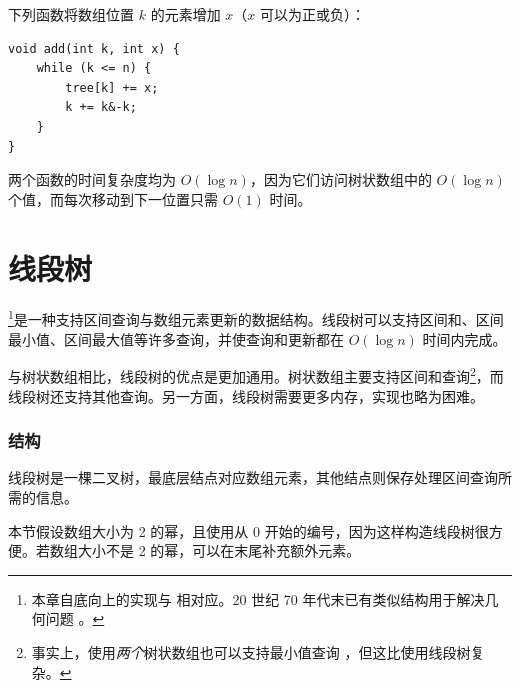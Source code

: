 下列函数将数组位置 $k$ 的元素增加 $x$（$x$ 可以为正或负）：
\begin{lstlisting}
void add(int k, int x) {
    while (k <= n) {
        tree[k] += x;
        k += k&-k;
    }
}
\end{lstlisting}

两个函数的时间复杂度均为 $O(\log n)$，因为它们访问树状数组中的 $O(\log n)$ 个值，而每次移动到下一位置只需 $O(1)$ 时间。

\section{线段树}


\footnote{本章自底向上的实现与 \cite{sta06} 相对应。20 世纪 70 年代末已有类似结构用于解决几何问题 \cite{ben80}。}是一种支持区间查询与数组元素更新的数据结构。线段树可以支持区间和、区间最小值、区间最大值等许多查询，并使查询和更新都在 $O(\log n)$ 时间内完成。

与树状数组相比，线段树的优点是更加通用。树状数组主要支持区间和查询\footnote{事实上，使用\emph{两个}树状数组也可以支持最小值查询 \cite{dim15}，但这比使用线段树复杂。}，而线段树还支持其他查询。另一方面，线段树需要更多内存，实现也略为困难。

\subsubsection{结构}

线段树是一棵二叉树，最底层结点对应数组元素，其他结点则保存处理区间查询所需的信息。

本节假设数组大小为 2 的幂，且使用从 0 开始的编号，因为这样构造线段树很方便。若数组大小不是 2 的幂，可以在末尾补充额外元素。

